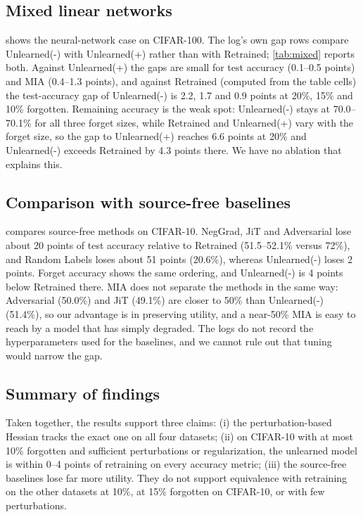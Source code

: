 \documentclass[10pt,twocolumn,letterpaper]{article}
\begin{document}
\subsection{Mixed linear networks}
\label{sec:mixed}

 shows the neural-network case on CIFAR-100.
The log's own gap rows compare Unlearned(-) with Unlearned(+) rather than with Retrained; \cref{tab:mixed} reports both.
Against Unlearned(+) the gaps are small for test accuracy (0.1--0.5 points) and MIA (0.4--1.3 points), and against Retrained (computed from the table cells) the test-accuracy gap of Unlearned(-) is 2.2, 1.7 and 0.9 points at 20\%, 15\% and 10\% forgotten.
Remaining accuracy is the weak spot: Unlearned(-) stays at 70.0--70.1\% for all three forget sizes, while Retrained and Unlearned(+) vary with the forget size, so the gap to Unlearned(+) reaches 6.6 points at 20\% and Unlearned(-) exceeds Retrained by 4.3 points there.
We have no ablation that explains this.

\subsection{Comparison with source-free baselines}
\label{sec:baselines}

 compares source-free methods on CIFAR-10.
NegGrad, JiT and Adversarial lose about 20 points of test accuracy relative to Retrained (51.5--52.1\% versus 72\%), and Random Labels loses about 51 points (20.6\%), whereas Unlearned(-) loses 2 points.
Forget accuracy shows the same ordering, and Unlearned(-) is 4 points below Retrained there.
MIA does not separate the methods in the same way: Adversarial (50.0\%) and JiT (49.1\%) are closer to 50\% than Unlearned(-) (51.4\%), so our advantage is in preserving utility, and a near-50\% MIA is easy to reach by a model that has simply degraded.
The logs do not record the hyperparameters used for the baselines, and we cannot rule out that tuning would narrow the gap.

\subsection{Summary of findings}
Taken together, the results support three claims: (i) the perturbation-based Hessian tracks the exact one on all four datasets; (ii) on CIFAR-10 with at most 10\% forgotten and sufficient perturbations or regularization, the unlearned model is within 0--4 points of retraining on every accuracy metric; (iii) the source-free baselines lose far more utility.
They do not support equivalence with retraining on the other datasets at 10\%, at 15\% forgotten on CIFAR-10, or with few perturbations.
\end{document}
